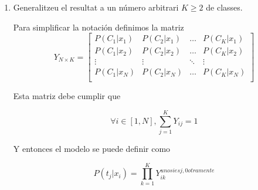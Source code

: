 \documentclass[a4paper]{article}
\begin{document}
\begin{enumerate}
{  %




  }

  \item Generalitzeu el resultat a un número arbitrari $K \geq 2$ de classes.

  {\bfseries

  Para simplificar la notación definimos la matriz
  \begin{equation*}
    Y_{N \times K} =
    \begin{bmatrix}
      P(C_1 | x_1) & P(C_2 | x_1) & \dots & P(C_K | x_1) \\
      P(C_1 | x_2) & P(C_2 | x_2) & \dots & P(C_K | x_2) \\
      \vdots       & \vdots       & \ddots& \vdots       \\
      P(C_1 | x_N) & P(C_2 | x_N) & \dots & P(C_K | x_N) \\
    \end{bmatrix}
  \end{equation*}

  Esta matriz debe cumplir que

  \begin{equation*}
    \forall i \in [1,N],  \sum_{j = 1}^{K} Y_{ij} = 1
  \end{equation*}

  Y entonces el modelo se puede definir como

  \begin{equation*}
    P(t_j | x_i) = \prod_{k = 1}^{K} Y_{ik}^{uno si es j, 0 otramente}
  \end{equation*}





  }
\end{enumerate}
\end{document}
